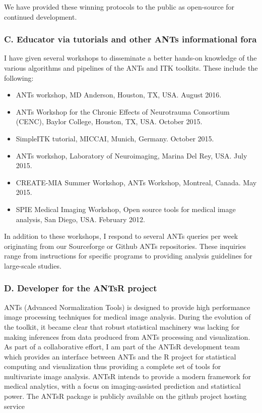 \documentclass[11pt,]{article}
\begin{document}
We have provided these winning protocols to the public as open-source
for continued development.

\subsubsection{C. Educator via tutorials and other ANTs informational
fora}\label{c.-educator-via-tutorials-and-other-ants-informational-fora}

I have given several workshops to disseminate a better hands-on
knowledge of the various algorithms and pipelines of the ANTs and ITK
toolkits. These include the following:

\begin{itemize}
\item
  ANTs workshop, MD Anderson, Houston, TX, USA. August 2016.
\item
  ANTs Workshop for the Chronic Effects of Neurotrauma Consortium
  (CENC), Baylor College, Houston, TX, USA. October 2015.
\item
  SimpleITK tutorial, MICCAI, Munich, Germany. October 2015.
\item
  ANTs workshop, Laboratory of Neuroimaging, Marina Del Rey, USA. July
  2015.
\item
  CREATE-MIA Summer Workshop, ANTs Workshop, Montreal, Canada. May 2015.
\item
  SPIE Medical Imaging Workshop, Open source tools for medical image
  analysis, San Diego, USA. February 2012.
\end{itemize}

In addition to these workshops, I respond to several ANTs queries per
week originating from our Sourceforge or Github ANTs repositories. These
inquiries range from instructions for specific programs to providing
analysis guidelines for large-scale studies.

\subsubsection{D. Developer for the ANTsR
project}\label{d.-developer-for-the-antsr-project}

ANTs (Advanced Normalization Tools) is designed to provide high
performance image processing techniques for medical image analysis.
During the evolution of the toolkit, it became clear that robust
statistical machinery was lacking for making inferences from data
produced from ANTs processing and visualization. As part of a
collaborative effort, I am part of the ANTsR development team which
provides an interface between ANTs and the R project for statistical
computing and visualization thus providing a complete set of tools for
multivariate image analysis. ANTsR intends to provide a modern framework
for medical analytics, with a focus on imaging-assisted prediction and
statistical power. The ANTsR package is publicly available on the github
project hosting service
\end{document}
